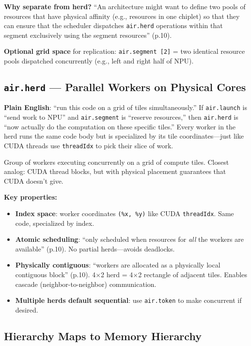 \documentclass[11pt,a4paper]{article}
\begin{document}
\textbf{Why separate from herd?} ``An architecture might want to define two pools of
resources that have physical affinity (e.g., resources in one chiplet) so that they
can ensure that the scheduler dispatches \texttt{air.herd} operations within that
segment exclusively using the segment resources'' (p.10).

\textbf{Optional grid space} for replication: \texttt{air.segment [2]} = two identical
resource pools dispatched concurrently (e.g., left and right half of NPU).

\subsection{\texttt{air.herd} --- Parallel Workers on Physical Cores}

\textbf{Plain English}: ``run this code on a grid of tiles simultaneously.'' If
\texttt{air.launch} is ``send work to NPU'' and \texttt{air.segment} is ``reserve
resources,'' then \texttt{air.herd} is ``now actually do the computation on these
specific tiles.'' Every worker in the herd runs the same code body but is
specialized by its tile coordinates---just like CUDA threads use
\texttt{threadIdx} to pick their slice of work.

Group of workers executing concurrently on a grid of compute tiles. Closest analog:
CUDA thread blocks, but with physical placement guarantees that CUDA doesn't give.

\textbf{Key properties:}
\begin{itemize}[leftmargin=2em]
  \item \textbf{Index space}: worker coordinates \texttt{(\%x, \%y)} like CUDA
    \texttt{threadIdx}. Same code, specialized by index.
  \item \textbf{Atomic scheduling}: ``only scheduled when resources for \emph{all}
    the workers are available'' (p.10). No partial herds---avoids deadlocks.
  \item \textbf{Physically contiguous}: ``workers are allocated as a physically local
    contiguous block'' (p.10). 4$\times$2 herd = 4$\times$2 rectangle of adjacent tiles.
    Enables cascade (neighbor-to-neighbor) communication.
  \item \textbf{Multiple herds default sequential}: use \texttt{air.token} to make
    concurrent if desired.
\end{itemize}

\subsection{Hierarchy Maps to Memory Hierarchy}
\end{document}
